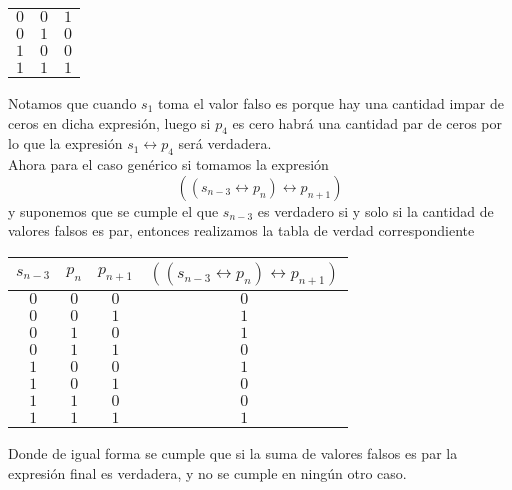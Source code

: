 \documentclass[letter]{article}
\begin{document}
\begin{pregunta}{1}
\begin{enumerate}
\begin{center}
\begin{tabular}{c c|c}
		\hline
		$0$&$0$&$1$\\
		$0$&$1$&$0$\\
		$1$&$0$&$0$\\
		$1$&$1$&$1$\\
		\end{tabular}
		\end{center}
		Notamos que cuando $s_1$ toma el valor falso es porque hay una cantidad impar de ceros en dicha expresión, luego si $p_4$ es cero habrá una cantidad par de ceros por lo que la expresión $s_1\leftrightarrow p_4$ será verdadera.\\
		Ahora para el caso genérico si tomamos la expresión
		$$((s_{n-3}\leftrightarrow p_n)\leftrightarrow p_{n+1})$$
		y suponemos que se cumple el que $s_{n-3}$ es verdadero si y solo si la cantidad de valores falsos es par, entonces realizamos la tabla de verdad correspondiente
		\begin{center}
		\begin{tabular}{c c c|c}
		$s_{n-3}$&$p_n$&$p_{n+1}$&$((s_{n-3}\leftrightarrow p_{n})\leftrightarrow p_{n+1})$\\
		\hline
		$0$&$0$&$0$&$0$\\
		$0$&$0$&$1$&$1$\\
		$0$&$1$&$0$&$1$\\
		$0$&$1$&$1$&$0$\\
		$1$&$0$&$0$&$1$\\
		$1$&$0$&$1$&$0$\\
		$1$&$1$&$0$&$0$\\
		$1$&$1$&$1$&$1$\\
		\end{tabular}
		\end{center}		
		Donde de igual forma se cumple que si la suma de valores falsos es par la expresión final es verdadera, y no se cumple en ningún otro caso.
		\end{enumerate}
		
	\end{pregunta}
	
\end{document}
